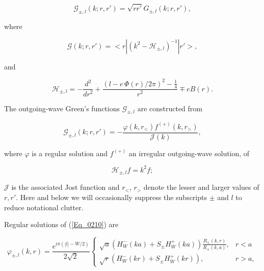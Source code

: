 \documentclass[a4paper,twocolumn,showpacs,preprintnumbers,amsmath,amssymb]{revtex4}
\newcommand{\odho}[2]{\ensuremath{\frac{d^{#1}}{d #2^{#1} }}}
\begin{document}
\begin{equation}
\label{Eq_0206}
\mathcal{G}_{\pm,l}(k;r,r') = \sqrt{rr'} G_{\pm,l}(k;r,r'),
\end{equation}

\noindent
where

\begin{equation}
\label{Eq_0207}
\mathcal{G}(k;r,r') = <r|(k^2 - \mathcal{H}_{\pm,l})^{-1}|r'>,
\end{equation}

\noindent
and

\begin{equation}
\label{Eq_0208}
\mathcal{H}_{\pm,l} = - \odho{2}{r}
	+ \frac{(l - e \, \Phi(r) / 2\pi)^2 - \frac{1}{4}}{r^2} \mp e B(r).
\end{equation}

The outgoing-wave Green's functions $\mathcal{G}_{\pm, l}$ are
constructed from ~\cite{Newton82}

\begin{equation}
\label{Eq_0209}
\mathcal{G}_{\pm,l}(k;r,r')
	= - \frac{\varphi(k, r_{<}) f^{(+)}(k, r_{>})}{\mathcal{J}(k)},
\end{equation}

\noindent
where $\varphi$ is a regular solution and $f^{(+)}$ an irregular
outgoing-wave solution, of

\begin{equation}
\label{Eq_0210}
\mathcal{H}_{\pm,l} f = k^2 f;
\end{equation}

\noindent
$\mathcal{J}$ is the associated Jost function and $r_{<}$, $r_{>}$ denote the lesser and
larger values of $r, r'$. Here and below we will occasionally suppress
the subscripts $\pm$ and $l$ to reduce notational clutter.

Regular solutions of (\ref{Eq_0210}) are

\begin{widetext}
\begin{equation}
\label{Eq_0211}
\varphi_{\pm, l}(k,r) = 
\frac{e^{i\pi(|l| - W/2)}}{2\sqrt{2}}
\begin{cases}
\displaystyle
\sqrt{a} \left( H^{-}_{W} (ka) + S_{\pm} H^{+}_{W} (ka) \right)
  \frac{R_{\pm}(k,r)}{R_{\pm} (k,a)}, & r < a	\\[3mm]
\displaystyle
\sqrt{r} \left( H^{-}_{W} (kr) + S_{\pm} H^{+}_{W} (kr) \right), 
  & r > a,
\end{cases}
\end{equation}
\end{widetext}
\end{document}
